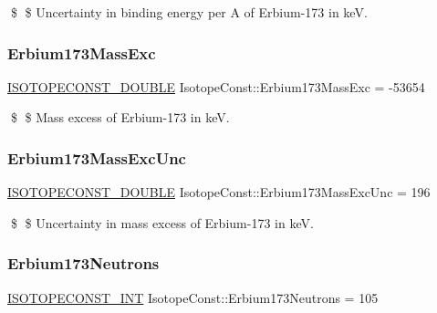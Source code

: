 \$ \$ Uncertainty in binding energy per A of Erbium-\/173 in keV. \mbox{\label{group___isotope_const-_erbium-_er173_ga135276a9fe7427296b689ac7958059ac}} 
\subsubsection{\texorpdfstring{Erbium173\+Mass\+Exc}{Erbium173MassExc}}
{\footnotesize\ttfamily \mbox{\hyperlink{group___isotope_const-_macros_ga8f45a7272ce02c0b4c65c44636ed719a}{I\+S\+O\+T\+O\+P\+E\+C\+O\+N\+S\+T\+\_\+\+D\+O\+U\+B\+LE}} Isotope\+Const\+::\+Erbium173\+Mass\+Exc = -\/53654}

\$ \$ Mass excess of Erbium-\/173 in keV. \mbox{\label{group___isotope_const-_erbium-_er173_ga41ca6910477d58efbe68f3ade7d411cb}} 
\subsubsection{\texorpdfstring{Erbium173\+Mass\+Exc\+Unc}{Erbium173MassExcUnc}}
{\footnotesize\ttfamily \mbox{\hyperlink{group___isotope_const-_macros_ga8f45a7272ce02c0b4c65c44636ed719a}{I\+S\+O\+T\+O\+P\+E\+C\+O\+N\+S\+T\+\_\+\+D\+O\+U\+B\+LE}} Isotope\+Const\+::\+Erbium173\+Mass\+Exc\+Unc = 196}

\$ \$ Uncertainty in mass excess of Erbium-\/173 in keV. \mbox{\label{group___isotope_const-_erbium-_er173_ga6e6dfa28f4dd8aecb8de9c060b7406fa}} 
\subsubsection{\texorpdfstring{Erbium173\+Neutrons}{Erbium173Neutrons}}
{\footnotesize\ttfamily \mbox{\hyperlink{group___isotope_const-_macros_ga5f18360b3e99483a35c32d789e62621c}{I\+S\+O\+T\+O\+P\+E\+C\+O\+N\+S\+T\+\_\+\+I\+NT}} Isotope\+Const\+::\+Erbium173\+Neutrons = 105}

